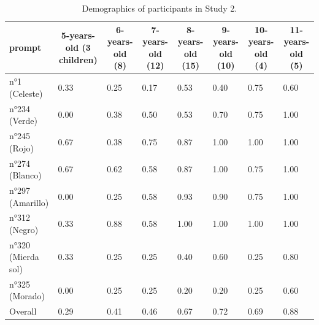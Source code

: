 \documentclass[
  english,
  ,man,floatsintext]{apa6}
\begin{document}
\begin{table}[tbp]

\begin{center}
\begin{threeparttable}

\caption{\label{tab:study2-prodtable}Demographics of participants in Study 2.}

\begin{tabular}{llllllll}
\toprule
prompt & \multicolumn{1}{c}{5-years-old (3 children)} & \multicolumn{1}{c}{6-years-old (8)} & \multicolumn{1}{c}{7-years-old (12)} & \multicolumn{1}{c}{8-years-old (15)} & \multicolumn{1}{c}{9-years-old (10)} & \multicolumn{1}{c}{10-years-old (4)} & \multicolumn{1}{c}{11-years-old (5)}\\
\midrule
n°1 (Celeste) & 0.33 & 0.25 & 0.17 & 0.53 & 0.40 & 0.75 & 0.60\\
n°234 (Verde) & 0.00 & 0.38 & 0.50 & 0.53 & 0.70 & 0.75 & 1.00\\
n°245 (Rojo) & 0.67 & 0.38 & 0.75 & 0.87 & 1.00 & 1.00 & 1.00\\
n°274 (Blanco) & 0.67 & 0.62 & 0.58 & 0.87 & 1.00 & 0.75 & 1.00\\
n°297 (Amarillo) & 0.00 & 0.25 & 0.58 & 0.93 & 0.90 & 0.75 & 1.00\\
n°312 (Negro) & 0.33 & 0.88 & 0.58 & 1.00 & 1.00 & 1.00 & 1.00\\
n°320 (Mierda sol) & 0.33 & 0.25 & 0.25 & 0.40 & 0.60 & 0.25 & 0.80\\
n°325 (Morado) & 0.00 & 0.25 & 0.25 & 0.20 & 0.20 & 0.25 & 0.60\\
Overall & 0.29 & 0.41 & 0.46 & 0.67 & 0.72 & 0.69 & 0.88\\
\bottomrule
\end{tabular}

\end{threeparttable}
\end{center}

\end{table}
\end{document}
